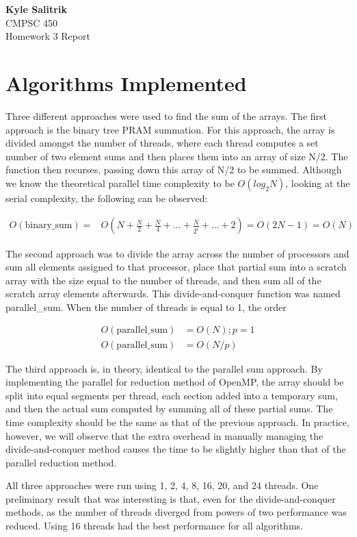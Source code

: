 \documentclass[a4paper, 11pt]{article}
\begin{document}
\graphicspath{{./figures/}}
\noindent
\large\textbf{Kyle Salitrik} \\
\normalsize CMPSC 450\\
\large{Homework 3 Report} \hfill 

\section*{Algorithms Implemented}
Three different approaches were used to find the sum of the arrays. The first approach is the binary tree PRAM summation. For this approach, the array is divided amongst the number of threads, where each thread computes a set number of two element sums and then places them into an array of size N/2. The function then recurses, passing down this array of N/2 to be summed. Although we know the theoretical parallel time complexity to be $O(log_2 N)$, looking at the serial complexity, the following can be observed:

\begin{align*}
	O(\text{binary\_sum}) = & O(N + \frac{N}{2} + \frac{N}{4} + \dots + \frac{N}{2^i} + \dots + 2) = O(2N-1) = O(N)
\end{align*}

The second approach was to divide the array across the number of processors and sum all elements assigned to that processor, place that partial sum into a scratch array with the size equal to the number of threads, and then sum all of the scratch array elements afterwards. This divide-and-conquer function was named parallel\_sum. When the number of threads is equal to 1, the order

\begin{align*}
		O(\text{parallel\_sum}) &= O(N); p=1 \\
		O(\text{parallel\_sum}) &= O(N/p)
\end{align*}

The third approach is, in theory, identical to the parallel sum approach. By implementing the parallel for reduction method of OpenMP, the array should be split into equal segments per thread, each section added into a temporary sum, and then the actual sum computed by summing all of these partial sums. The time complexity should be the same as that of the previous approach. In practice, however, we will observe that the extra overhead in manually managing the divide-and-conquer method causes the time to be slightly higher than that of the parallel reduction method.

All three approaches were run using 1, 2, 4, 8, 16, 20, and 24 threads. One preliminary result that was interesting is that, even for the divide-and-conquer methods, as the number of threads diverged from powers of two performance was reduced. Using 16 threads had the best performance for all algorithms.
\end{document}
